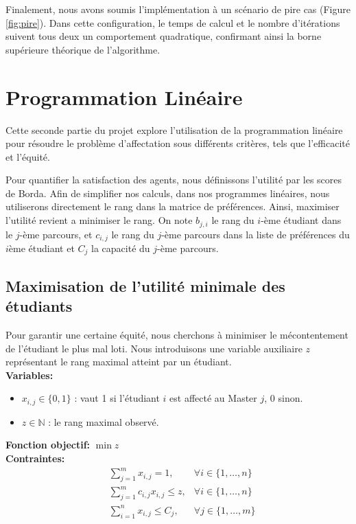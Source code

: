 \documentclass{article}
\begin{document}
Finalement, nous avons soumis l'implémentation à un scénario de pire cas (Figure \ref{fig:pire}). 
Dans cette configuration, le temps de calcul et le nombre d'itérations suivent tous deux 
un comportement quadratique, confirmant ainsi la borne supérieure théorique de l'algorithme.



\section{Programmation Linéaire}

Cette seconde partie du projet explore l'utilisation de la programmation linéaire pour résoudre le problème 
d'affectation sous différents critères, tels que l'efficacité et l'équité.

Pour quantifier la satisfaction des agents, nous définissons l'utilité par les scores de Borda. Afin de simplifier
nos calculs, dans nos programmes linéaires, nous utiliserons directement le rang dans la matrice de préférences. Ainsi,
maximiser l'utilité revient a minimiser le rang. On note $b_{j,i}$ le rang du $i$-ème étudiant dans le $j$-ème parcours,
et $c_{i,j}$ le rang du $j$-ème parcours dans la liste de préférences du $i$ème étudiant et $C_j$ la capacité du $j$-ème
parcours.


\subsection{Maximisation de l'utilité minimale des étudiants}

Pour garantir une certaine équité, nous cherchons à minimiser le mécontentement de l'étudiant le 
plus mal loti. Nous introduisons une variable auxiliaire $z$ représentant le rang maximal
atteint par un étudiant.\\
\textbf{Variables:}
\begin{itemize}
    \item $x_{i,j} \in \{0, 1\}$ : vaut 1 si l'étudiant $i$ est affecté au Master $j$, 0 sinon.
    \item $z \in \mathbb{N}$ : le rang maximal observé.
\end{itemize}
\textbf{Fonction objectif:} $\min z$ \\
\textbf{Contraintes:}
\begin{align*}
    & \sum_{j=1}^{m} x_{i,j} = 1, & \forall i \in \{1, \dots, n\} \\
    & \sum_{j=1}^{m} c_{i,j} x_{i,j} \le z, & \forall i \in \{1, \dots, n\} \\
    & \sum_{i=1}^{n} x_{i,j} \le C_j, & \forall j \in \{1, \dots, m\} \\
\end{align*}
\end{document}
